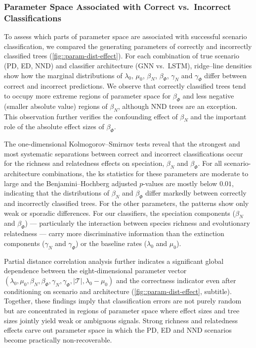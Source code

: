 {\subsubsection{Parameter Space Associated with Correct vs.\ Incorrect Classifications}
\label{ch3::sec::results::classification::correct-incorrect}
To assess which parts of parameter space are associated with successful scenario classification, we compared the generating parameters of correctly and incorrectly classified trees (\autoref{fig::param-dist-effect}). For each combination of true scenario (PD, ED, NND) and classifier architecture (GNN vs.\ LSTM), ridge--line densities show how the marginal distributions of $\lambda_0$, $\mu_0$, $\beta_N$, $\beta_{\varPhi}$, $\gamma_N$ and $\gamma_{\varPhi}$ differ between correct and incorrect predictions. We observe that correctly classified trees tend to occupy more extreme regions of parameter space for $\beta_{\varPhi}$ and less negative (smaller absolute value) regions of $\beta_N$, although NND trees are an exception. This observation further verifies the confounding effect of $\beta_N$ and the important role of the absolute effect sizes of $\beta_{\varPhi}$.

The one-dimensional Kolmogorov--Smirnov tests reveal that the strongest and most systematic separations between correct and incorrect classifications occur for the richness and relatedness effects on speciation, $\beta_N$ and $\beta_{\varPhi}$. For all scenario-architecture combinations, the \acrshort{ks} statistics for these parameters are moderate to large and the Benjamini--Hochberg adjusted $p$-values are mostly below $0.01$, indicating that the distributions of $\beta_N$ and $\beta_{\varPhi}$ differ markedly between correctly and incorrectly classified trees. For the other parameters, the patterns show only weak or sporadic differences. For our classifiers, the speciation components ($\beta_N$ and $\beta_\varPhi$) --- particularly the interaction between species richness and evolutionary relatedness --- carry more discriminative information than the extinction components ($\gamma_N$ and $\gamma_\varPhi$) or the baseline rates ($\lambda_0$ and $\mu_0$).

Partial distance correlation analysis further indicates a significant global dependence between the eight-dimensional parameter vector $(\lambda_0,\mu_0,\beta_N,\beta_{\varPhi},\gamma_N,\gamma_{\varPhi},|\mathcal{T}|,\lambda_0-\mu_0)$ and the correctness indicator even after conditioning on scenario and architecture (\autoref{fig::param-dist-effect}, subtitle). Together, these findings imply that classification errors are not purely random but are concentrated in regions of parameter space where effect sizes and tree sizes jointly yield weak or ambiguous signals. Strong richness and relatedness effects carve out parameter space in which the PD, ED and NND scenarios become practically non-recoverable.

}
